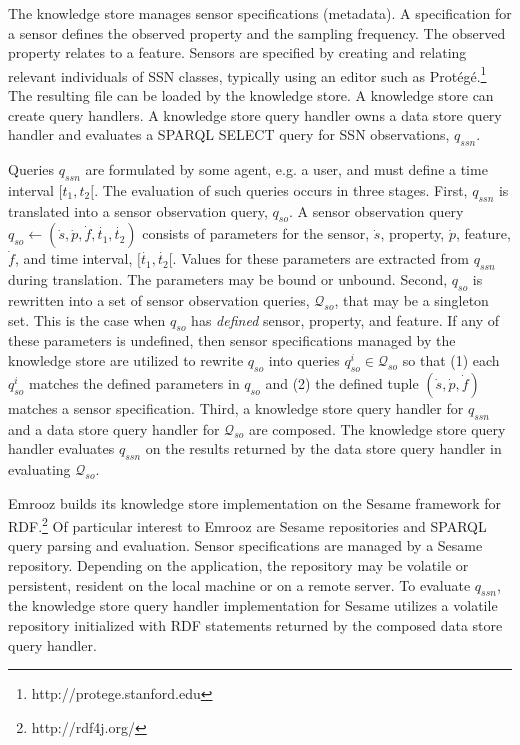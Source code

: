 \documentclass[preprint,12pt,authoryear]{elsarticle}
\begin{document}
The knowledge store manages sensor specifications (metadata). A specification for a sensor defines the observed property and the sampling frequency. The observed property relates to a feature. Sensors are specified by creating and relating relevant individuals of SSN classes, typically using an editor such as Prot{\'e}g{\'e}.\footnote{http://protege.stanford.edu} The resulting file can be loaded by the knowledge store. A knowledge store can create query handlers. A knowledge store query handler owns a data store query handler and evaluates a SPARQL SELECT query for SSN observations, $q_{ssn}$.

Queries $q_{ssn}$ are formulated by some agent, e.g. a user, and must define a time interval $[t_1, t_2[$. The evaluation of such queries occurs in three stages. First, $q_{ssn}$ is translated into a sensor observation query, $q_{so}$. A sensor observation query $q_{so} \leftarrow (\dot{s}, \dot{p}, \dot{f}, \dot{t_1}, \dot{t_2})$ consists of parameters for the sensor, $\dot{s}$, property, $\dot{p}$, feature, $\dot{f}$, and time interval, $[\dot{t_1}, \dot{t_2}[$. Values for these parameters are extracted from $q_{ssn}$ during translation. The parameters may be bound or unbound. Second, $q_{so}$ is rewritten into a set of sensor observation queries, $\mathcal{Q}_{so}$, that may be a singleton set. This is the case when $q_{so}$ has \emph{defined} sensor, property, and feature. If any of these parameters is undefined, then sensor specifications managed by the knowledge store are utilized to rewrite $q_{so}$ into queries $q^i_{so} \in \mathcal{Q}_{so}$ so that (1) each $q^i_{so}$ matches the defined parameters in $q_{so}$ and (2) the defined tuple $(\dot{s}, \dot{p}, \dot{f})$ matches a sensor specification. Third, a knowledge store query handler for $q_{ssn}$ and a data store query handler for $\mathcal{Q}_{so}$ are composed. The knowledge store query handler evaluates $q_{ssn}$ on the results returned by the data store query handler in evaluating $\mathcal{Q}_{so}$.

Emrooz builds its knowledge store implementation on the Sesame framework for RDF.\footnote{http://rdf4j.org/} Of particular interest to Emrooz are Sesame repositories and SPARQL query parsing and evaluation. Sensor specifications are managed by a Sesame repository. Depending on the application, the repository may be volatile or persistent, resident on the local machine or on a remote server. To evaluate $q_{ssn}$, the knowledge store query handler implementation for Sesame utilizes a volatile repository initialized with RDF statements returned by the composed data store query handler.
\end{document}
